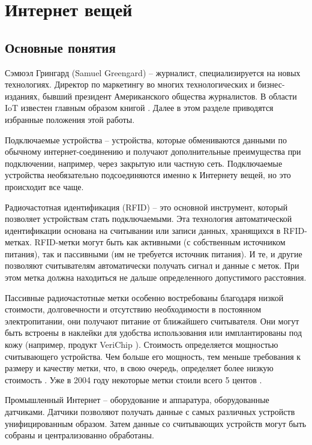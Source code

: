 \section{Интернет вещей} \label{ch1:sec2}

\subsection{Основные понятия} %

Сэмюэл Грингард (Samuel Greengard) – журналист, специализируется на новых технологиях.  Директор по маркетингу во многих технологических и бизнес-изданиях, бывший президент Американского общества журналистов. В области IoT известен главным образом книгой \cite{src19}. Далее в этом разделе приводятся избранные положения этой работы.

Подключаемые устройства – устройства, которые обмениваются данными по обычному интернет-соединению и получают дополнительные преимущества при подключении, например, через закрытую или частную сеть. Подключаемые устройства необязательно подсоединяются именно к Интернету вещей, но это происходит все чаще.

Радиочастотная идентификация (RFID) – это основной инструмент, который позволяет устройствам стать подключаемыми. Эта технология автоматической идентификации основана на считывании или записи данных, хранящихся в RFID-метках. RFID-метки могут быть как активными (с собственным источником питания), так и пассивными (им не требуется источник питания). И те, и другие позволяют считывателям автоматически получать сигнал и данные с меток. При этом метка должна находиться не дальше определенного допустимого расстояния.

Пассивные радиочастотные метки особенно востребованы благодаря низкой стоимости, долговечности и отсутствию необходимости в постоянном электропитании, они получают питание от ближайшего считывателя. Они могут быть встроены в наклейки для удобства использования или имплантированы под кожу (например, продукт VeriChip \cite{src16}). Стоимость определяется мощностью считывающего устройства. Чем больше его мощность, тем меньше требования к размеру и качеству метки, что, в свою очередь, определяет более низкую стоимость \cite{src17}. Уже в 2004 году некоторые метки стоили всего 5 центов \cite{src18}.

Промышленный Интернет – оборудование и аппаратура, оборудованные датчиками. Датчики позволяют получать данные с самых различных устройств унифицированным образом. Затем данные со считывающих устройств могут быть собраны и централизованно обработаны. 

